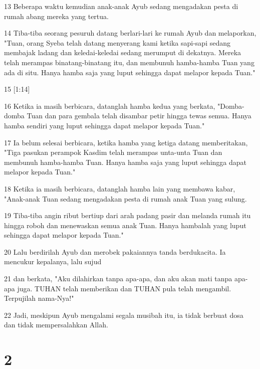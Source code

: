 \par 13 Beberapa waktu kemudian anak-anak Ayub sedang mengadakan pesta di rumah abang mereka yang tertua.
\par 14 Tiba-tiba seorang pesuruh datang berlari-lari ke rumah Ayub dan melaporkan, "Tuan, orang Syeba telah datang menyerang kami ketika sapi-sapi sedang membajak ladang dan keledai-keledai sedang merumput di dekatnya. Mereka telah merampas binatang-binatang itu, dan membunuh hamba-hamba Tuan yang ada di situ. Hanya hamba saja yang luput sehingga dapat melapor kepada Tuan."
\par 15 [1:14]
\par 16 Ketika ia masih berbicara, datanglah hamba kedua yang berkata, "Domba-domba Tuan dan para gembala telah disambar petir hingga tewas semua. Hanya hamba sendiri yang luput sehingga dapat melapor kepada Tuan."
\par 17 Ia belum selesai berbicara, ketika hamba yang ketiga datang memberitakan, "Tiga pasukan perampok Kasdim telah merampas unta-unta Tuan dan membunuh hamba-hamba Tuan. Hanya hamba saja yang luput sehingga dapat melapor kepada Tuan."
\par 18 Ketika ia masih berbicara, datanglah hamba lain yang membawa kabar, "Anak-anak Tuan sedang mengadakan pesta di rumah anak Tuan yang sulung.
\par 19 Tiba-tiba angin ribut bertiup dari arah padang pasir dan melanda rumah itu hingga roboh dan menewaskan semua anak Tuan. Hanya hambalah yang luput sehingga dapat melapor kepada Tuan."
\par 20 Lalu berdirilah Ayub dan merobek pakaiannya tanda berdukacita. Ia mencukur kepalanya, lalu sujud
\par 21 dan berkata, "Aku dilahirkan tanpa apa-apa, dan aku akan mati tanpa apa-apa juga. TUHAN telah memberikan dan TUHAN pula telah mengambil. Terpujilah nama-Nya!"
\par 22 Jadi, meskipun Ayub mengalami segala musibah itu, ia tidak berbuat dosa dan tidak mempersalahkan Allah.

\chapter{2}

